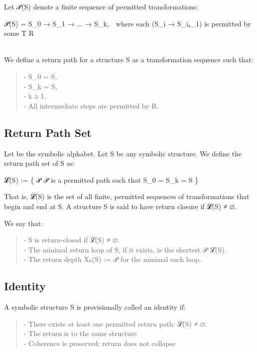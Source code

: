 Let 𝒫(S) denote a finite sequence of permitted transformations:

𝒫(S) = S_0 → S_1 → ... → S_k, where each (S_i → S_i₊_1) is permitted by some T
\in R\\
\strut \\
We define a return path for a structure S as a transformation sequence
such that:

\begin{quote}
- S_0 = S,\\
- S_k = S,\\
- k ≥ 1,\\
- All intermediate steps are permitted by R.
\end{quote}

\subsection{Return Path Set}\label{return-path-set}

Let \Sigma be the symbolic alphabet. Let S \in \Sigma* be any symbolic structure. We
define the return path set of S as:

𝓛(S) := \{ 𝒫 \textbar{} 𝒫 is a permitted path such that S_0 = S_k = S \}

That is, 𝓛(S) is the set of all finite, permitted sequences of
transformations that begin and end at S. A structure S is said to have
return closure if 𝓛(S) ≠ ∅.

We say that:

\begin{quote}
- S is return-closed if 𝓛(S) ≠ ∅.\\
- The minimal return loop of S, if it exists, is the shortest 𝒫 \in
𝓛(S).\\
- The return depth Xₕ(S) := \textbar 𝒫\textbar{} for the minimal such
loop.
\end{quote}

\subsection{Identity}\label{identity}

A symbolic structure S is provisionally called an identity if:

\begin{quote}
- There exists at least one permitted return path: 𝓛(S) ≠ ∅.\\
- The return is to the same structure\\
- Coherence is preserved: return does not collapse
\end{quote}

